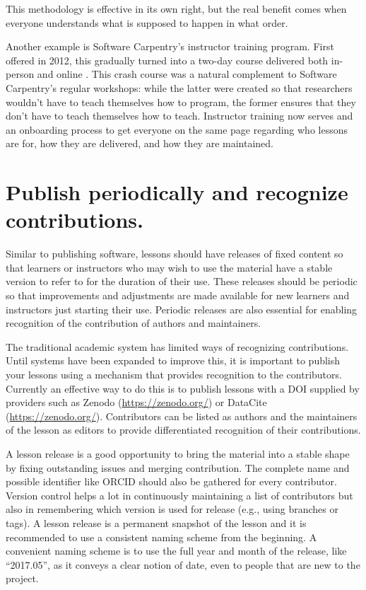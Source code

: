 \documentclass[10pt,letterpaper]{article}
\newcommand{\rulemajor}[1]{\section{#1}}
\begin{document}
This methodology is effective in its own right,
but the real benefit comes when everyone understands what is supposed to happen
in what order.

Another example is Software Carpentry's instructor training program.
First offered in 2012,
this gradually turned into a two-day course delivered both in-person and online
\cite{lessons-learned}.
This crash course was a natural complement to Software Carpentry's regular workshops:
while the latter were created so that researchers wouldn't have to teach themselves how to program,
the former ensures that they don't have to teach themselves how to teach.
Instructor training now serves and an onboarding process to get everyone on the same page
regarding who lessons are for,
how they are delivered,
and how they are maintained.

\rulemajor{Publish periodically and recognize contributions.}

Similar to publishing software,
lessons should have releases of fixed content
so that learners or instructors who may wish to use the material have a stable version to refer to
for the duration of their use.
These releases should be periodic
so that improvements and adjustments are made available
for new learners and instructors just starting their use.
Periodic releases are also essential
for enabling recognition of the contribution of authors and maintainers.

The traditional academic system has limited ways of recognizing contributions.
Until systems have been expanded to improve this,
it is important to publish your lessons using a mechanism that provides recognition to the contributors.
Currently an effective way to do this is
to publish lessons with a DOI supplied by providers such as Zenodo (\url{https://zenodo.org/})
or DataCite (\url{https://zenodo.org/}).
Contributors can be listed as authors
and the maintainers of the lesson as editors
to provide differentiated recognition of their contributions.

A lesson release is a good opportunity to bring the material into a stable shape
by fixing outstanding issues and merging contribution.
The complete name and possible identifier like ORCID should also be gathered for every contributor.
Version control helps a lot in continuously maintaining a list of contributors
but also in remembering which version is used for release
(e.g., using branches or tags).
A lesson release is a permanent snapshot of the lesson
and it is recommended to use a consistent naming scheme from the beginning.
A convenient naming scheme is to use the full year and month of the release,
like ``2017.05'',
as it conveys a clear notion of date,
even to people that are new to the project.
\end{document}
